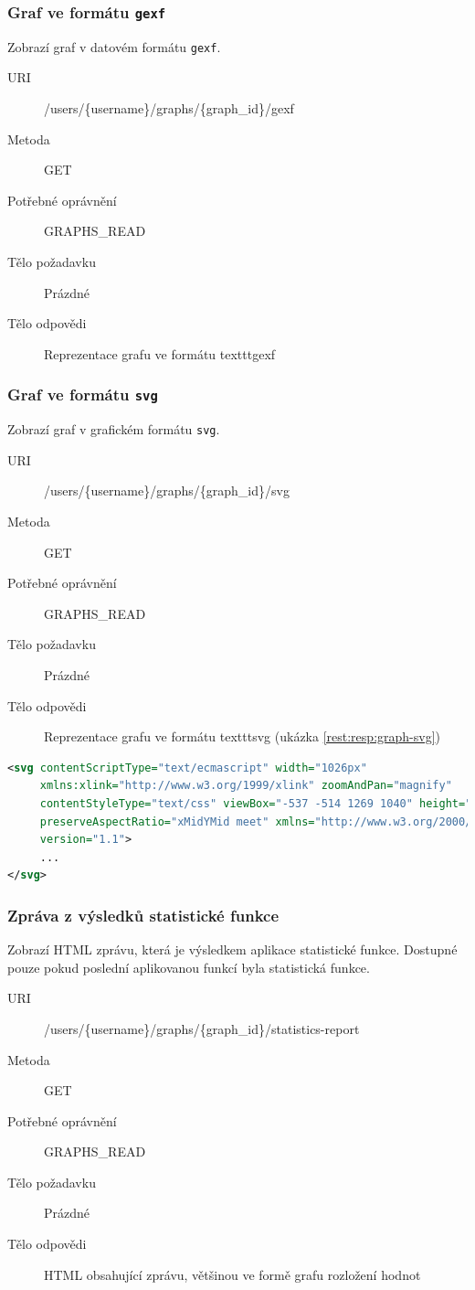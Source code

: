 \documentclass[thesis=M,czech]{FITthesis}[2014/05/6]
\begin{document}
\subsubsection{Graf ve formátu \texttt{gexf}}
Zobrazí graf v datovém formátu \texttt{gexf}.
\begin{description}
  \item[URI] /users/\{username\}/graphs/\{graph\_id\}/gexf
  \item[Metoda] GET
  \item[Potřebné oprávnění] GRAPHS\_READ
  \item[Tělo požadavku] Prázdné
  \item[Tělo odpovědi] Reprezentace grafu ve formátu texttt{gexf}
\end{description}

\subsubsection{Graf ve formátu \texttt{svg}}
Zobrazí graf v grafickém formátu \texttt{svg}.
\begin{description}
  \item[URI] /users/\{username\}/graphs/\{graph\_id\}/svg
  \item[Metoda] GET
  \item[Potřebné oprávnění] GRAPHS\_READ
  \item[Tělo požadavku] Prázdné
  \item[Tělo odpovědi] Reprezentace grafu ve formátu texttt{svg} (ukázka \ref{rest:resp:graph-svg})
\end{description}

\begin{lstlisting}[caption=Tělo odpovědi zdroje /users/\{username\}/graphs/\{graph\_id\}/svg (GET), label=rest:resp:graph-svg, language=xml]
<svg contentScriptType="text/ecmascript" width="1026px"
     xmlns:xlink="http://www.w3.org/1999/xlink" zoomAndPan="magnify"
     contentStyleType="text/css" viewBox="-537 -514 1269 1040" height="841px"
     preserveAspectRatio="xMidYMid meet" xmlns="http://www.w3.org/2000/svg"
     version="1.1">
     ...
</svg>
\end{lstlisting}  

\subsubsection{Zpráva z výsledků statistické funkce}
Zobrazí HTML zprávu, která je výsledkem aplikace statistické funkce. Dostupné pouze pokud poslední aplikovanou funkcí byla statistická funkce.
\begin{description}
  \item[URI] /users/\{username\}/graphs/\{graph\_id\}/statistics-report
  \item[Metoda] GET
  \item[Potřebné oprávnění] GRAPHS\_READ
  \item[Tělo požadavku] Prázdné
  \item[Tělo odpovědi] HTML obsahující zprávu, většinou ve formě grafu rozložení hodnot
\end{description}
\end{document}
